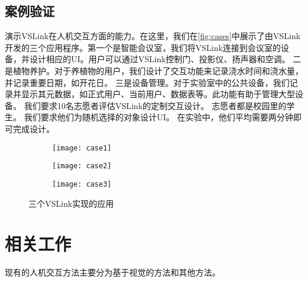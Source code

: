 \section{案例验证}
演示VSLink在人机交互方面的能力。在这里，我们在\autoref{fig:cases}中展示了由VSLink开发的三个应用程序。第一个是智能会议室，我们将VSLink连接到会议室的设备，并设计相应的UI。用户可以通过VSLink控制门、投影仪、扬声器和空调。
二是植物养护。对于养植物的用户，我们设计了交互功能来记录浇水时间和浇水量，并记录重要日期，如开花日。
三是设备管理。对于实验室中的公共设备，我们记录并显示其元数据，如正式用户、当前用户、数据表等。此功能有助于管理大型设备。
我们要求10名志愿者评估VSLink的定制交互设计。
志愿者都是校园里的学生。
我们要求他们为随机选择的对象设计UI。
在实验中，他们平均需要两分钟即可完成设计。

\begin{figure}[t]
	\centering
	\begin{subfigure}{.65\linewidth}
		\texttt{[image: case1]}
		\caption{}
	\end{subfigure}
	\begin{subfigure}{.65\linewidth}
		\texttt{[image: case2]}
		\caption{}
	\end{subfigure}
	\begin{subfigure}{.65\linewidth}
		\texttt{[image: case3]}
		\caption{}
	\end{subfigure}
	\caption{三个VSLink实现的应用}\label{fig:cases}
\end{figure}


\chapter{相关工作}\label{chap:related}
现有的人机交互方法主要分为基于视觉的方法和其他方法。


